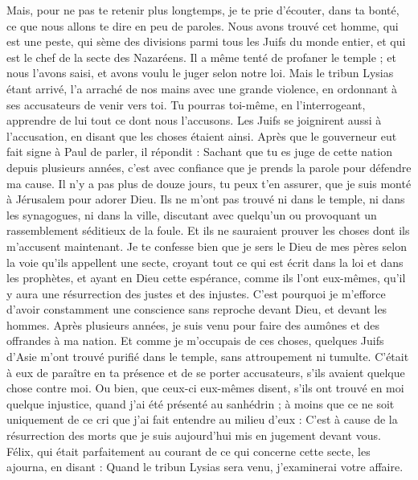\begin{multicols}{2}
Mais, pour ne pas te retenir plus longtemps, je te prie d’écouter, dans ta bonté, ce que nous allons te dire en peu de paroles.
Nous avons trouvé cet homme, qui est une peste, qui sème des divisions parmi tous les Juifs du monde entier, et qui est le chef de la secte des Nazaréens.
Il a même tenté de profaner le temple ; et nous l'avons saisi, et avons voulu le juger selon notre loi.
Mais le tribun Lysias étant arrivé, l'a arraché de nos mains avec une grande violence,
en ordonnant à ses accusateurs de venir vers toi. Tu pourras toi-même, en l'interrogeant, apprendre de lui tout ce dont nous l'accusons.
Les Juifs se joignirent aussi à l’accusation, en disant que les choses étaient ainsi.
Après que le gouverneur eut fait signe à Paul de parler, il répondit : Sachant que tu es juge de cette nation depuis plusieurs années, c’est avec confiance que je prends la parole pour défendre ma cause.
Il n’y a pas plus de douze jours, tu peux t’en assurer, que je suis monté à Jérusalem pour adorer Dieu.
Ils ne m’ont pas trouvé ni dans le temple, ni dans les synagogues, ni dans la ville, discutant avec quelqu’un ou provoquant un rassemblement séditieux de la foule.
Et ils ne sauraient prouver les choses dont ils m'accusent maintenant.
Je te confesse bien que je sers le Dieu de mes pères selon la voie qu’ils appellent une secte, croyant tout ce qui est écrit dans la loi et dans les prophètes,
et ayant en Dieu cette espérance, comme ils l’ont eux-mêmes, qu’il y aura une résurrection des justes et des injustes.
C'est pourquoi je m’efforce d’avoir constamment une conscience sans reproche devant Dieu, et devant les hommes.
Après plusieurs années, je suis venu pour faire des aumônes et des offrandes à ma nation.
Et comme je m’occupais de ces choses, quelques Juifs d’Asie m’ont trouvé purifié dans le temple, sans attroupement ni tumulte.
C’était à eux de paraître en ta présence et de se porter accusateurs, s’ils avaient quelque chose contre moi.
Ou bien, que ceux-ci eux-mêmes disent, s'ils ont trouvé en moi quelque injustice, quand j'ai été présenté au sanhédrin ;
à moins que ce ne soit uniquement de ce cri que j’ai fait entendre au milieu d’eux : C’est à cause de la résurrection des morts que je suis aujourd’hui mis en jugement devant vous.
Félix, qui était parfaitement au courant de ce qui concerne cette secte, les ajourna, en disant : Quand le tribun Lysias sera venu, j’examinerai votre affaire.

\end{multicols}
